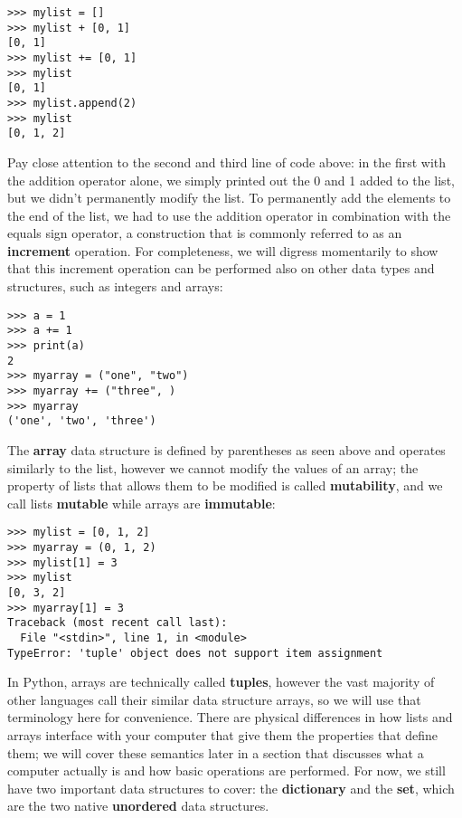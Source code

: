 \documentclass[a4paper,11pt]{article}
\begin{document}
\vspace{3mm}
\begin{lstlisting}
>>> mylist = []
>>> mylist + [0, 1]
[0, 1]
>>> mylist += [0, 1]
>>> mylist
[0, 1]
>>> mylist.append(2)
>>> mylist
[0, 1, 2]
\end{lstlisting}
\vspace{3mm}

Pay close attention to the second and third line of code above: in the first with the addition operator alone, 
we simply printed out the 0 and 1 added to the list, but we didn't permanently modify the list.  
To permanently add the elements to the end of the list, we had to use the addition operator in combination with 
the equals sign operator, a construction that is commonly referred to as an \textbf{increment} operation.  For 
completeness, we will digress momentarily to show that this increment operation can be performed also on other 
data types and structures, such as integers and arrays:

\vspace{3mm}
\begin{lstlisting}
>>> a = 1
>>> a += 1
>>> print(a)
2
>>> myarray = ("one", "two")
>>> myarray += ("three", )
>>> myarray
('one', 'two', 'three')
\end{lstlisting}
\vspace{3mm}

The \textbf{array} data structure is defined by parentheses as seen above and operates similarly to the list, 
however we cannot modify 
the values of an array; the property of lists that allows them to be modified is called \textbf{mutability}, 
and we call lists \textbf{mutable} while arrays are \textbf{immutable}:

\vspace{3mm}
\begin{lstlisting}
>>> mylist = [0, 1, 2]
>>> myarray = (0, 1, 2)
>>> mylist[1] = 3
>>> mylist
[0, 3, 2]
>>> myarray[1] = 3
Traceback (most recent call last):
  File "<stdin>", line 1, in <module>
TypeError: 'tuple' object does not support item assignment
\end{lstlisting}
\vspace{3mm}

In Python, arrays are technically called \textbf{tuples}, however the vast majority of other languages 
call their similar data structure arrays, so we will use that terminology here for convenience.  There 
are physical differences in how lists and arrays interface with your computer that give them the 
properties that define them; we will cover these semantics later in a section that discusses what 
a computer actually is and how basic operations are performed.  For now, we still have two important 
data structures to cover: the \textbf{dictionary} and the \textbf{set}, which are the two native 
\textbf{unordered} data structures. \par
\end{document}
